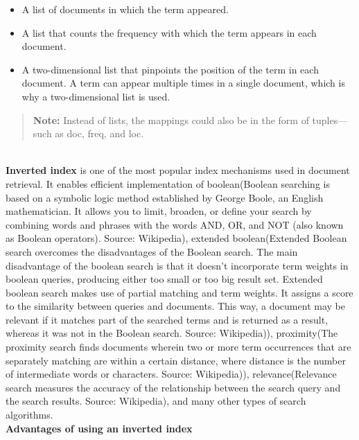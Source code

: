 \begin{itemize}
\item
\protect{}\label{LqWXv4W7sXJPesw7deD_R}
A list of documents in which the term appeared.
\item
\protect{}\label{AO0zfdSWZ8nYlyJp7qG3N}
A list that counts the frequency with which the term appears in each document.
\item
\protect{}\label{rihodmHMTy4alvXWDBx1P}
A two-dimensional list that pinpoints the position of the term in each document. A term can appear multiple times in a single document, which is why a two-dimensional list is used.
\end{itemize}
\begin{quote}
\textbf{Note:} Instead of lists, the mappings could also be in the form of tuples--- such as doc, freq, and loc.
\end{quote}
\\
\textbf{Inverted index} is one of the most popular index mechanisms used in document retrieval. It enables efficient implementation of boolean(Boolean searching is based on a symbolic logic method established by George Boole, an English mathematician. It allows you to limit, broaden, or define your search by combining words and phrases with the words AND, OR, and NOT (also known as Boolean operators). Source: Wikipedia), extended boolean(Extended Boolean search overcomes the disadvantages of the Boolean search. The main disadvantage of the boolean search is that it doesn't incorporate term weights in boolean queries, producing either too small or too big result set. Extended boolean search makes use of partial matching and term weights. It assigns a score to the similarity between queries and documents. This way, a document may be relevant if it matches part of the searched terms and is returned as a result, whereas it was not in the Boolean search. Source: Wikipedia)), proximity(The proximity search finds documents wherein two or more term occurrences that are separately matching are within a certain distance, where distance is the number of intermediate words or characters. Source: Wikipedia)), relevance(Relevance search measures the accuracy of the relationship between the search query and the search results. Source: Wikipedia), and many other types of search algorithms.
\\
\textbf{Advantages of using an inverted index}

